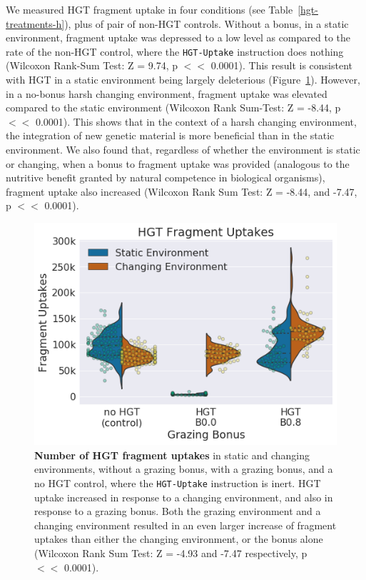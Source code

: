 \documentclass[PhD]{msu-thesis}
\begin{document}
We measured HGT fragment uptake in four conditions (see Table~\ref{hgt-treatments-h}), plus of pair of non-HGT controls. Without a bonus, in a static environment, fragment uptake was depressed to a low level as compared to the rate of the non-HGT control, where the \texttt{HGT-Uptake} instruction does nothing (Wilcoxon Rank-Sum Test: Z = 9.74, p $<<$ 0.0001). This result is consistent with HGT in a static environment being largely deleterious (Figure~\ref{fig:hgt_fragment_uptake}). However, in a no-bonus harsh changing environment, fragment uptake was elevated compared to the static environment (Wilcoxon Rank Sum-Test: Z = -8.44, p $<<$ 0.0001). This shows that in the context of a harsh changing environment, the integration of new genetic material is more beneficial than in the static environment. We also found that, regardless of whether the environment is static or changing, when a bonus to fragment uptake was provided (analogous to the nutritive benefit granted by natural competence in biological organisms), fragment uptake also increased (Wilcoxon Rank Sum Test: Z = -8.44, and -7.47, p $<<$ 0.0001). 

	\begin{figure}[h!]
	\begin{center}
	\includegraphics[width=0.75\columnwidth]{figures/HGT/hgt_fragment_uptake.png}
	\caption{ \textbf{Number of HGT fragment uptakes} in static and changing environments, without a grazing bonus, with a grazing bonus, and a no HGT control, where the \texttt{HGT-Uptake} instruction is inert. HGT uptake increased in response to a changing environment, and also in response to a grazing bonus. Both the grazing environment and a changing environment resulted in an even larger increase of fragment uptakes than either the changing environment, or the bonus alone (Wilcoxon Rank Sum Test: Z = -4.93 and -7.47 respectively, p $<<$ 0.0001).
	}\label{fig:hgt_fragment_uptake}
	\end{center}
	\end{figure}
\end{document}
